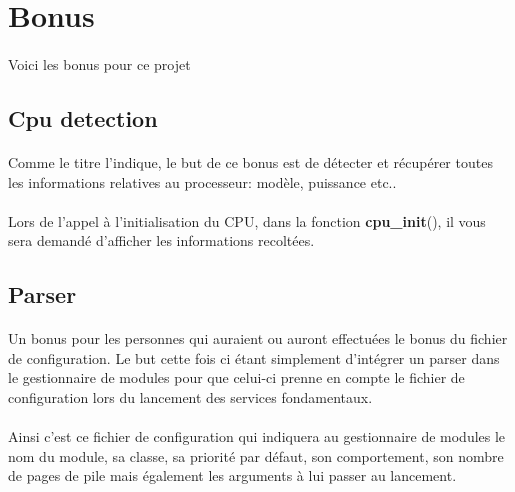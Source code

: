 \documentclass[10pt,a4wide]{article}
\begin{document}
\section{Bonus}

\paragraph{}

Voici les bonus pour ce projet

\subsection{Cpu detection}

\paragraph{}

Comme le titre l'indique, le but de ce bonus est de d\'etecter et r\'ecup\'erer
toutes les informations relatives au processeur: mod\`ele, puissance etc..

\paragraph{}

Lors de l'appel \`a l'initialisation du CPU, dans la fonction
\textbf{cpu\_init}(), il vous sera demand\'e d'afficher les informations
recolt\'ees.

\subsection{Parser}

\paragraph{}

Un bonus pour les personnes qui auraient ou auront effectu\'ees le bonus
du fichier de configuration. Le but cette fois ci \'etant simplement
d'int\'egrer un parser dans le gestionnaire de modules pour que celui-ci
prenne en compte le fichier de configuration lors du lancement des
services fondamentaux.

\paragraph{}

Ainsi c'est ce fichier de configuration qui indiquera au gestionnaire de
modules le nom du module, sa classe, sa priorit\'e par d\'efaut, son
comportement, son nombre de pages de pile mais \'egalement les arguments
\`a lui passer au lancement.
\end{document}
